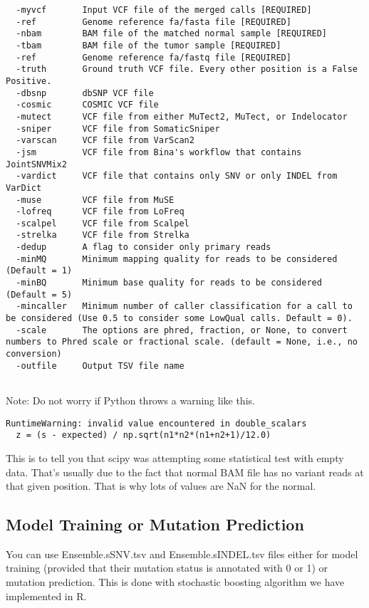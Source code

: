 \documentclass[10pt,letterpaper]{article}
\begin{document}
\begin{sloppypar}
\begin{lstlisting}
  -myvcf       Input VCF file of the merged calls [REQUIRED]
  -ref         Genome reference fa/fasta file [REQUIRED]
  -nbam        BAM file of the matched normal sample [REQUIRED]
  -tbam        BAM file of the tumor sample [REQUIRED]
  -ref         Genome reference fa/fastq file [REQUIRED]
  -truth       Ground truth VCF file. Every other position is a False Positive.
  -dbsnp       dbSNP VCF file
  -cosmic      COSMIC VCF file
  -mutect      VCF file from either MuTect2, MuTect, or Indelocator
  -sniper      VCF file from SomaticSniper
  -varscan     VCF file from VarScan2
  -jsm         VCF file from Bina's workflow that contains JointSNVMix2
  -vardict     VCF file that contains only SNV or only INDEL from VarDict
  -muse        VCF file from MuSE
  -lofreq      VCF file from LoFreq
  -scalpel     VCF file from Scalpel
  -strelka     VCF file from Strelka
  -dedup       A flag to consider only primary reads
  -minMQ       Minimum mapping quality for reads to be considered (Default = 1)
  -minBQ       Minimum base quality for reads to be considered (Default = 5)
  -mincaller   Minimum number of caller classification for a call to be considered (Use 0.5 to consider some LowQual calls. Default = 0).
  -scale       The options are phred, fraction, or None, to convert numbers to Phred scale or fractional scale. (default = None, i.e., no conversion)
  -outfile     Output TSV file name
                        
\end{lstlisting}


Note: Do not worry if Python throws a warning like this. 

\begin{lstlisting}
RuntimeWarning: invalid value encountered in double_scalars
  z = (s - expected) / np.sqrt(n1*n2*(n1+n2+1)/12.0)
\end{lstlisting}

This is to tell you that scipy was attempting some statistical test with empty data. That's usually due to the fact that normal BAM file has no variant reads at that given position. That is why lots of values are NaN for the normal. 




\subsection{Model Training or Mutation Prediction}

You can use Ensemble.sSNV.tsv and Ensemble.sINDEL.tsv files either for model training (provided that their mutation status is annotated with 0 or 1) or mutation prediction. This is done with stochastic boosting algorithm we have implemented in R. 
	

\end{sloppypar}
\end{document}
